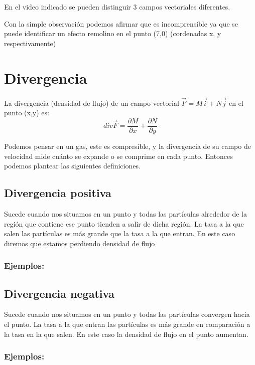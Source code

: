 \documentclass[10pt]{article}
\begin{document}
	\parindent=0.2in
	\hangindent=0.2in
	En el video indicado se pueden distinguir 3 campos vectoriales diferentes.

	\parindent=0.2in
	\hangindent=0.2in
	Con la simple observación podemos afirmar que es incomprensible ya que  se puede identificar un efecto remolino en el punto (7,0) (cordenadas x, y respectivamente)

\section{Divergencia}
	La divergencia (densidad de flujo) de un campo vectorial \( \vec{F} = M\vec{i} + N\vec{j} \) en el punto (x,y) es:
	\[ div\vec{F} = \frac{\partial M}{\partial x} + \frac{\partial N}{\partial y} \]

	Podemos pensar en un gas, este es compresible, y la divergencia de su campo de velocidad mide cuánto se expande o se comprime en cada punto. Entonces podemos plantear las siguientes definiciones.
	\\

\subsection{Divergencia positiva}
	\parindent=0.2in
	\hangindent=0.2in
	Sucede cuando nos situamos en un punto y todas las partículas alrededor de la región que contiene ese punto tienden a salir de dicha región. La tasa a la que salen las partículas es más grande que la tasa a la que entran. En este caso diremos que estamos perdiendo densidad de flujo
	
\subsubsection{Ejemplos:}%
	\parindent=0.4in
	\hangindent=0.4in


\subsection{Divergencia negativa}%
	\parindent=0.2in
	\hangindent=0.2in
	Sucede cuando nos situamos en un punto y todas las partículas convergen hacia el punto. La tasa a la que entran las partículas es más grande en comparación a la tasa en la que salen. En este caso la densidad de flujo en el punto aumentan.

\subsubsection{Ejemplos:}%
	\parindent=0.4in
	\hangindent=0.4in
\end{document}

